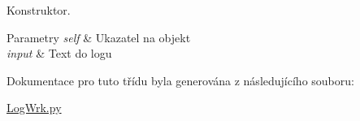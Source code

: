 Konstruktor. 


\begin{DoxyParams}{Parametry}
{\em self} & Ukazatel na objekt \\
\hline
{\em input} & Text do logu \\
\hline
\end{DoxyParams}


Dokumentace pro tuto třídu byla generována z následujícího souboru\-:\begin{DoxyCompactItemize}
\item 
\hyperlink{LogWrk_8py}{Log\-Wrk.\-py}\end{DoxyCompactItemize}
